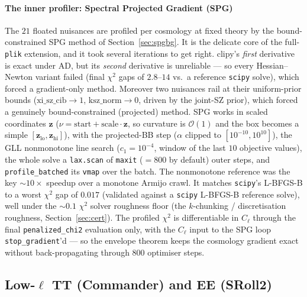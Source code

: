\documentclass[11pt]{article}
\newcommand{\code}[1]{\texttt{\small #1}}
\newcommand{\Cl}{C_\ell}
\newcommand{\chisq}{\chi^2}
\begin{document}
\paragraph{The inner profiler: Spectral Projected Gradient (SPG)}
\label{sec:spg}
The $21$ floated nuisances are profiled per cosmology at fixed theory by
the bound-constrained SPG method of Section~\ref{sec:spgbg}. It is the
delicate core of the full-\code{plik} extension, and it took several
iterations to get right. clipy's \emph{first} derivative is exact under AD,
but its \emph{second} derivative is unreliable --- so every
Hessian--Newton variant failed (final $\chisq$ gaps of $2.8$--$14$ vs.\ a
reference \code{scipy} solve), which forced a gradient-only method.
Moreover two nuisances rail at their uniform-prior bounds
($\mathrm{xi\_sz\_cib}\to1$, $\mathrm{ksz\_norm}\to0$, driven by the
joint-SZ prior), which forced a genuinely bound-constrained (projected)
method. SPG works in scaled coordinates $\bm z$
($\nu=\mathrm{start}+\mathrm{scale}\cdot\bm z$, so curvature is
$\mathcal O(1)$ and the box becomes a simple
$[\bm z_{\mathrm{lo}},\bm z_{\mathrm{hi}}]$), with the projected-BB step
($\alpha$ clipped to $[10^{-10},10^{10}]$), the GLL nonmonotone line
search ($c_1=10^{-4}$, window of the last $10$ objective values), the
whole solve a \code{lax.scan} of \code{maxit} ($=800$ by default) outer
steps, and \code{profile\_batched} its \code{vmap} over the batch. The
nonmonotone reference was the key $\sim10\times$ speedup over a monotone
Armijo crawl. It matches \code{scipy}'s L-BFGS-B to a worst $\chisq$ gap
of $0.017$ (validated against a \code{scipy} L-BFGS-B reference solve),
well under the $\sim0.1$ $\chisq$ solver roughness floor (the $k$-chunking
/ discretisation roughness, Section~\ref{sec:cert}). The profiled $\chisq$ is differentiable in $\Cl$
through the final \code{penalized\_chi2} evaluation only, with the $\Cl$
input to the SPG loop \code{stop\_gradient}'d --- so the envelope theorem
keeps the cosmology gradient exact without back-propagating through $800$
optimiser steps.

\subsection{Low-$\ell$ TT (Commander) and EE (SRoll2)}
\label{sec:lowl}
\end{document}
